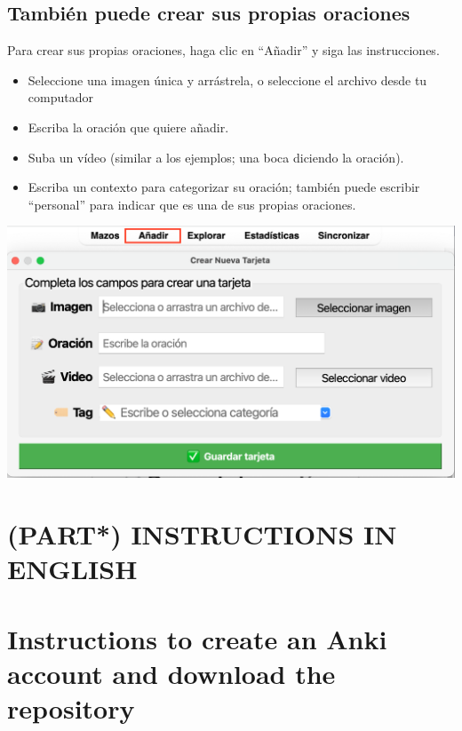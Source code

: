 \documentclass[
]{book}
\providecommand{\tightlist}{%
  \setlength{\itemsep}{0pt}\setlength{\parskip}{0pt}}
\begin{document}
\section{También puede crear sus propias oraciones}\label{tambiuxe9n-puede-crear-sus-propias-oraciones}

Para crear sus propias oraciones, haga clic en ``Añadir'' y siga las instrucciones.

\begin{itemize}
\tightlist
\item
  Seleccione una imagen única y arrástrela, o seleccione el archivo desde tu computador
\item
  Escriba la oración que quiere añadir.
\item
  Suba un vídeo (similar a los ejemplos; una boca diciendo la oración).
\item
  Escriba un contexto para categorizar su oración; también puede escribir ``personal'' para indicar que es una de sus propias oraciones.
\end{itemize}

\includegraphics[width=0.9\linewidth]{images/reposit_sp/nuevas}

\chapter*{\texorpdfstring{(PART*) \textbf{INSTRUCTIONS IN ENGLISH}}{(PART*) INSTRUCTIONS IN ENGLISH}}\label{part-instructions-in-english}

\chapter{Instructions to create an Anki account and download the repository}\label{instructions-to-create-an-anki-account-and-download-the-repository}
\end{document}
